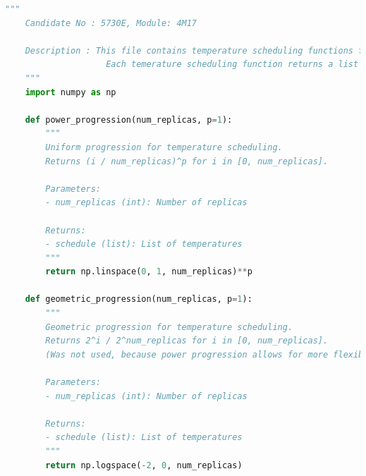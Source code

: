 \documentclass[10pt]{article}
\begin{document}
\begin{lstlisting}[language=Python, caption=temp\_prog\_functions.py, label=temp_prog_functionspy]
    """
    Candidate No : 5730E, Module: 4M17 
    
    Description : This file contains temperature scheduling functions for parallel tempering.
                    Each temerature scheduling function returns a list of temperatures ranging from 0 to 1.
    """
    import numpy as np
    
    def power_progression(num_replicas, p=1):
        """
        Uniform progression for temperature scheduling. 
        Returns (i / num_replicas)^p for i in [0, num_replicas].
    
        Parameters:
        - num_replicas (int): Number of replicas
    
        Returns:
        - schedule (list): List of temperatures
        """
        return np.linspace(0, 1, num_replicas)**p
    
    def geometric_progression(num_replicas, p=1):
        """
        Geometric progression for temperature scheduling. 
        Returns 2^i / 2^num_replicas for i in [0, num_replicas].
        (Was not used, because power progression allows for more flexibility).
        
        Parameters:
        - num_replicas (int): Number of replicas
    
        Returns:
        - schedule (list): List of temperatures
        """
        return np.logspace(-2, 0, num_replicas)    
\end{lstlisting}
\end{document}
